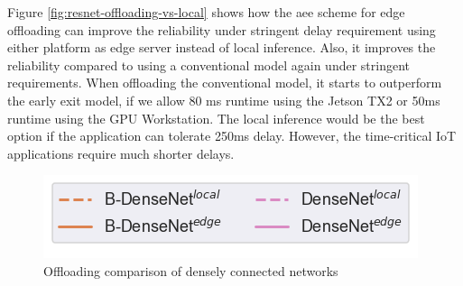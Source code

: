 Figure \ref{fig:resnet-offloading-vs-local} shows how the \gls{aee} scheme for edge offloading can improve the reliability under stringent delay requirement using either platform as edge server instead of local inference. Also, it improves the reliability compared to using a conventional model again under stringent requirements. When offloading the conventional model, it starts to outperform the early exit model, if we allow 80 ms runtime using the Jetson TX2 or 50ms runtime using the GPU Workstation. The local inference would be the best option if the application can tolerate 250ms delay. However, the time-critical IoT applications require much shorter delays. 
\begin{figure}
	\captionsetup[subfigure]{justification=centering, farskip=0pt,captionskip=0pt}
	\centering
	\includegraphics[width=.3\linewidth]{figures/edge/gpu_b-densenet_offloading_vs_local_legend}
	\hfill
	\hfill
	\caption[Offloading comparison of densely connected networks]{Offloading comparison of densely connected networks}
	\label{fig:densenet-offloading-vs-local}
\end{figure}

